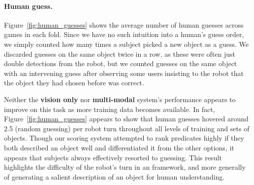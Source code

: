 \paragraph{Human guess.}
Figure~\ref{fig:human_guesses} shows the average number of human guesses across games in each fold.
Since we have no such intuition into a human's guess order, we simply counted how many times a subject picked a new object as a guess.
We discarded guesses on the same object twice in a row, as these were often just double detections from the robot, but we counted guesses on the same object with an intervening guess after observing some users insisting to the robot that the object they had chosen before was correct.

Neither the \textbf{vision only} nor \textbf{multi-modal} system's performance appears to improve on this task as more training data becomes available.
In fact, Figure~\ref{fig:human_guesses} appears to show that human guesses hovered around 2.5 (random guessing) per robot turn throughout all levels of training and sets of objects.
Though our scoring system attempted to rank predicates highly if they both described an object well and differentiated it from the other options, it appears that subjects always effectively resorted to guessing.
This result highlights the difficulty of the robot's turn in an \ispy framework, and more generally of generating a salient description of an object for human understanding.